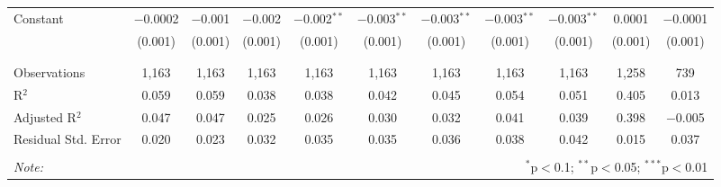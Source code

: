 \begin{table}[!htbp]
\begin{tabular}{@{\extracolsep{5pt}}lcccccccccc}
 Constant & $-$0.0002 & $-$0.001 & $-$0.002 & $-$0.002$^{**}$ & $-$0.003$^{**}$ & $-$0.003$^{**}$ & $-$0.003$^{**}$ & $-$0.003$^{**}$ & 0.0001 & $-$0.0001 \\ 
  & (0.001) & (0.001) & (0.001) & (0.001) & (0.001) & (0.001) & (0.001) & (0.001) & (0.001) & (0.001) \\ 
  & & & & & & & & & & \\ 
\hline \\[-1.8ex] 
Observations & 1,163 & 1,163 & 1,163 & 1,163 & 1,163 & 1,163 & 1,163 & 1,163 & 1,258 & 739 \\ 
R$^{2}$ & 0.059 & 0.059 & 0.038 & 0.038 & 0.042 & 0.045 & 0.054 & 0.051 & 0.405 & 0.013 \\ 
Adjusted R$^{2}$ & 0.047 & 0.047 & 0.025 & 0.026 & 0.030 & 0.032 & 0.041 & 0.039 & 0.398 & $-$0.005 \\ 
Residual Std. Error & 0.020 & 0.023 & 0.032 & 0.035 & 0.035 & 0.036 & 0.038 & 0.042 & 0.015 & 0.037 \\ 
\hline 
\hline \\[-1.8ex] 
\textit{Note:}  & \multicolumn{10}{r}{$^{*}$p$<$0.1; $^{**}$p$<$0.05; $^{***}$p$<$0.01} \\ 
\end{tabular} 
\end{table} 
